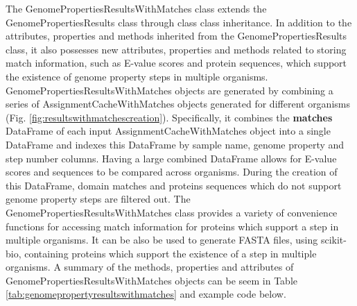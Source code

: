 The GenomePropertiesResultsWithMatches class extends the GenomePropertiesResults class through class class inheritance. In addition to the attributes, properties and methods inherited from the GenomePropertiesResults class, it also possesses new attributes, properties and methods related to storing match information, such as E-value scores and protein sequences, which support the existence of genome property steps in multiple organisms. GenomePropertiesResultsWithMatches objects are generated by combining a series of AssignmentCacheWithMatches objects generated for different organisms (Fig. \ref{fig:resultswithmatchescreation}). Specifically, it combines the \textbf{matches} DataFrame of each input AssignmentCacheWithMatches object into a single DataFrame and indexes this DataFrame by sample name, genome property and step number columns. Having a large combined DataFrame allows for E-value scores and sequences to be compared across organisms. During the creation of this DataFrame, domain matches and proteins sequences which do not support genome property steps are filtered out. The GenomePropertiesResultsWithMatches class provides a variety of convenience functions for accessing match information for proteins which support a step in multiple organisms. It can be also be used to generate FASTA files, using scikit-bio, containing proteins which support the existence of a step in multiple organisms. A summary of the methods, properties and attributes of GenomePropertiesResultsWithMatches objects can be seem in Table \ref{tab:genomepropertyresultswithmatches} and example code below. 



